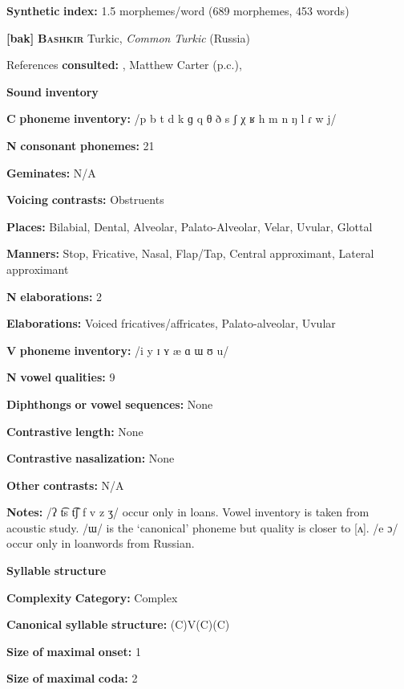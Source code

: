 \textbf{Synthetic} \textbf{index:} 1.5 morphemes/word (689 morphemes, 453 words)

\textbf{[bak]}   \textbf{\textsc{Bashkir}}  Turkic, \textit{Common} \textit{Turkic} (Russia)

References \textbf{consulted:} \citet{BerksonEtAl2016}, Matthew Carter (p.c.), \citet{Poppe1964}

\textbf{Sound} \textbf{inventory}

\textbf{C} \textbf{phoneme} \textbf{inventory:} /p b t d k ɡ q θ ð s ʃ χ ʁ h m n ŋ l ɾ w j/

\textbf{N} \textbf{consonant} \textbf{phonemes:} 21

\textbf{Geminates:} N/A

\textbf{Voicing} \textbf{contrasts:} Obstruents

\textbf{Places:} Bilabial, Dental, Alveolar, Palato-Alveolar, Velar, Uvular, Glottal

\textbf{Manners:} Stop, Fricative, Nasal, Flap/Tap, Central approximant, Lateral approximant

\textbf{N} \textbf{elaborations:} 2

\textbf{Elaborations:} Voiced fricatives/affricates, Palato-alveolar, Uvular

\textbf{V} \textbf{phoneme} \textbf{inventory:} /i y ɪ ʏ æ ɑ ɯ ʊ u/

\textbf{N} \textbf{vowel} \textbf{qualities:} 9

\textbf{Diphthongs} \textbf{or} \textbf{vowel} \textbf{sequences:} None

\textbf{Contrastive} \textbf{length:} None

\textbf{Contrastive} \textbf{nasalization:} None

\textbf{Other} \textbf{contrasts:} N/A

\textbf{Notes:} /ʔ t͡s t͡ʃ f v z ʒ/ occur only in loans. Vowel inventory is taken from \citet{BerksonEtAl2016} acoustic study. /ɯ/ is the ‘canonical’ phoneme but quality is closer to [ʌ]. /e ɔ/ occur only in loanwords from Russian.

\textbf{Syllable} \textbf{structure}

\textbf{Complexity} \textbf{Category:} Complex

\textbf{Canonical} \textbf{syllable} \textbf{structure:} (C)V(C)(C) \citep[12-18]{Poppe1964}

\textbf{Size} \textbf{of} \textbf{maximal} \textbf{onset:} 1

\textbf{Size} \textbf{of} \textbf{maximal} \textbf{coda:} 2

